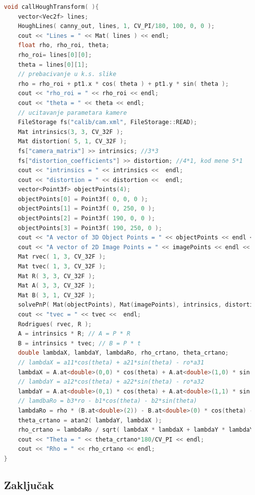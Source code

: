 \begin{lstlisting}[language=C,caption={Racunanje parametra ro i theta}]
void callHoughTransform( ){
    vector<Vec2f> lines;
    HoughLines( canny_out, lines, 1, CV_PI/180, 100, 0, 0 );
    cout << "Lines = " << Mat( lines ) << endl;
    float rho, rho_roi, theta;
    rho_roi= lines[0][0];
    theta = lines[0][1];
    // prebacivanje u k.s. slike
    rho = rho_roi + pt1.x * cos( theta ) + pt1.y * sin( theta );
    cout << "rho_roi = " << rho_roi << endl;
    cout << "theta = " << theta << endl;
    // ucitavanje parametara kamere
    FileStorage fs("calib/cam.xml", FileStorage::READ);
    Mat intrinsics(3, 3, CV_32F ); 
    Mat distortion( 5, 1, CV_32F );
    fs["camera_matrix"] >> intrinsics; //3*3
    fs["distortion_coefficients"] >> distortion; //4*1, kod mene 5*1
    cout << "intrinsics = " << intrinsics <<  endl;
    cout << "distortion = " << distortion <<  endl;
    vector<Point3f> objectPoints(4);
    objectPoints[0] = Point3f( 0, 0, 0 );
    objectPoints[1] = Point3f( 0, 250, 0 );
    objectPoints[2] = Point3f( 190, 0, 0 );
    objectPoints[3] = Point3f( 190, 250, 0 );
    cout << "A vector of 3D Object Points = " << objectPoints << endl << endl;
    cout << "A vector of 2D Image Points = " << imagePoints << endl << endl;
    Mat rvec( 1, 3, CV_32F );
    Mat tvec( 1, 3, CV_32F );
    Mat R( 3, 3, CV_32F );
    Mat A( 3, 3, CV_32F );
    Mat B( 3, 1, CV_32F );
    solvePnP( Mat(objectPoints), Mat(imagePoints), intrinsics, distortion, rvec, tvec, false );
    cout << "tvec = " << tvec <<  endl;
    Rodrigues( rvec, R );
    A = intrinsics * R; // A = P * R
    B = intrinsics * tvec; // B = P * t
    double lambdaX, lambdaY, lambdaRo, rho_crtano, theta_crtano;
    // lambdaX = a11*cos(theta) + a21*sin(theta) - ro*a31
    lambdaX = A.at<double>(0,0) * cos(theta) + A.at<double>(1,0) * sin(theta) - rho * (A.at<double>(2,0));
    // lambdaY = a12*cos(theta) + a22*sin(theta) - ro*a32
    lambdaY = A.at<double>(0,1) * cos(theta) + A.at<double>(1,1) * sin(theta) - rho * (A.at<double>(2,1));
    // lamdbaRo = b3*ro - b1*cos(theta) - b2*sin(theta) 
    lambdaRo = rho * (B.at<double>(2)) - B.at<double>(0) * cos(theta) - B.at<double>(1) * sin(theta); 
    theta_crtano = atan2( lambdaY, lambdaX );
    rho_crtano = lambdaRo / sqrt( lambdaX * lambdaX + lambdaY * lambdaY );
    cout << "Theta = " << theta_crtano*180/CV_PI << endl;
    cout << "Rho = " << rho_crtano << endl;
}

\end{lstlisting}

\subsection{Zaključak}


